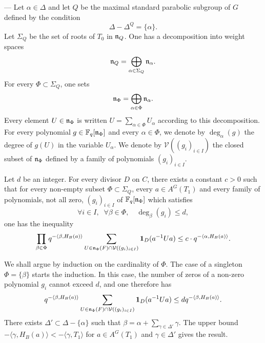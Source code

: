 \begin{paragr} ---\label{S:majoration}
Let $\alpha\in \Delta$ and let $Q$ be the maximal standard parabolic subgroup of $G$ defined by the condition
$$\Delta-\Delta^Q=\{\alpha\}.$$
Let $\Sigma_Q$ be the set of roots of $T_0$ in $\mathfrak{n}_Q$. One has a decomposition into weight spaces
$$\mathfrak{n}_Q=\bigoplus_{\alpha\in \Sigma_Q} \mathfrak{n}_\alpha.$$
For every $\Phi\subset \Sigma_Q$, one sets
$$\mathfrak{n}_\Phi=\bigoplus_{\alpha\in \Phi} \mathfrak{n}_\alpha.$$
Every element $U\in \mathfrak{n}_\Phi$ is written $U=\sum_{\alpha\in \Phi} U_\alpha$ according to this decomposition. For every polynomial $g\in \mathbb{F}_q[\mathfrak{n}_\Phi]$ and every $\alpha\in \Phi$, we denote by $\deg_\alpha(g)$ the degree of $g(U)$ in the variable $U_\alpha$. We denote by $\mathcal{V}((g_i)_{i\in I})$ the closed subset of $\mathfrak{n}_\Phi$ defined by a family of polynomials $(g_i)_{i\in I}$.

\begin{proposition}\label{prop:maj-sommes}
Let $d$ be an integer. For every divisor $D$ on $C$, there exists a constant $c>0$ such that for every non-empty subset $\Phi\subset \Sigma_Q$, every $a\in A^G(T_1)$ and every family of polynomials, not all zero, $(g_i)_{i\in I}$ of $\mathbb{F}_q[\mathfrak{n}_\Phi]$ which satisfies
$$\forall i\in I, \;\; \forall \beta\in \Phi, \quad \deg_\beta(g_i)\leq d,$$
one has the inequality
$$\prod_{\beta\in \Phi} q^{-\langle \beta,H_B(a)\rangle} \sum_{U\in \mathfrak{n}_\Phi(F)\cap \mathcal{V}((g_i)_{i\in I})} \mathbf{1}_D(a^{-1}Ua)\leq c\cdot q^{-\langle \alpha,H_B(a)\rangle}.$$
\end{proposition}

\begin{preuve}
We shall argue by induction on the cardinality of $\Phi$. The case of a singleton $\Phi=\{\beta\}$ starts the induction. In this case, the number of zeros of a non-zero polynomial $g_i$ cannot exceed $d$, and one therefore has
$$q^{-\langle \beta,H_B(a)\rangle} \sum_{U\in \mathfrak{n}_\Phi(F)\cap \mathcal{V}((g_i)_{i\in I})} \mathbf{1}_D(a^{-1}Ua)\leq dq^{-\langle \beta,H_B(a)\rangle}.$$
There exists $\Delta'\subset \Delta-\{\alpha\}$ such that $\beta=\alpha+\sum_{\gamma\in \Delta'}\gamma$. The upper bound $-\langle \gamma,H_B(a)\rangle <-\langle \gamma,T_1\rangle$ for $a\in A^G(T_1)$ and $\gamma\in \Delta'$ gives the result.


\end{preuve}
\end{paragr}
